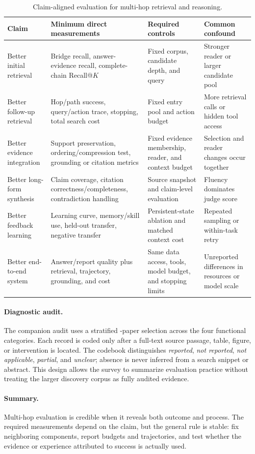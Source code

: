 \begin{table}[tbp]
\centering
\caption{Claim-aligned evaluation for multi-hop retrieval and reasoning.}
\label{tab:evaluation_alignment}
\small
\begin{tabularx}{\textwidth}{@{}p{2.8cm}p{4.1cm}Y Y@{}}
\toprule
Claim & Minimum direct measurements & Required controls & Common confound \\
\midrule
Better initial retrieval & Bridge recall, answer-evidence recall, complete-chain Recall@$K$ & Fixed corpus, candidate depth, and query & Stronger reader or larger candidate pool \\
Better follow-up retrieval & Hop/path success, query/action trace, stopping, total search cost & Fixed entry pool and action budget & More retrieval calls or hidden tool access \\
Better evidence integration & Support preservation, ordering/compression test, grounding or citation metrics & Fixed evidence membership, reader, and context budget & Selection and reader changes occur together \\
Better long-form synthesis & Claim coverage, citation correctness/completeness, contradiction handling & Source snapshot and claim-level evaluation & Fluency dominates judge score \\
Better feedback learning & Learning curve, memory/skill use, held-out transfer, negative transfer & Persistent-state ablation and matched context cost & Repeated sampling or within-task retry \\
Better end-to-end system & Answer/report quality plus retrieval, trajectory, grounding, and cost & Same data access, tools, model budget, and stopping limits & Unreported differences in resources or model scale \\
\bottomrule
\end{tabularx}
\end{table}

\paragraph{Diagnostic audit.}
The companion audit uses a stratified \AuditSize-paper selection across the four functional categories. Each record is coded only after a full-text source passage, table, figure, or intervention is located. The codebook distinguishes \emph{reported}, \emph{not reported}, \emph{not applicable}, \emph{partial}, and \emph{unclear}; absence is never inferred from a search snippet or abstract. This design allows the survey to summarize evaluation practice without treating the larger discovery corpus as fully audited evidence.



\paragraph{Summary.}
Multi-hop evaluation is credible when it reveals both outcome and process. The required measurements depend on the claim, but the general rule is stable: fix neighboring components, report budgets and trajectories, and test whether the evidence or experience attributed to success is actually used.

